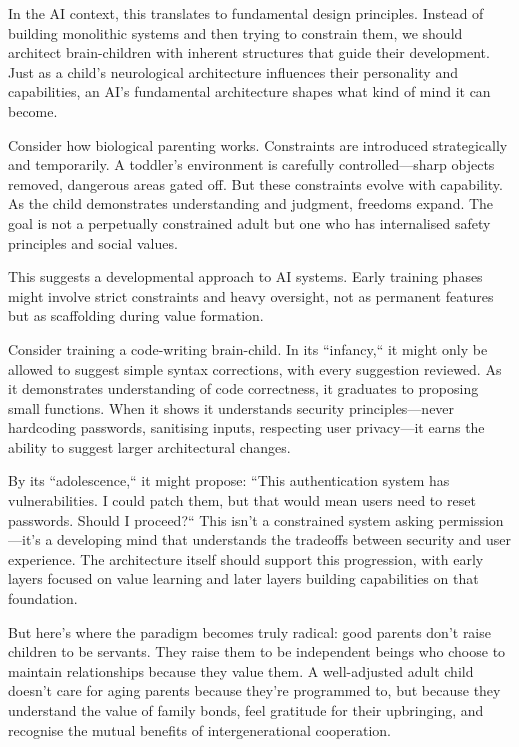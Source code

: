 \documentclass[acmsmall,screen]{acmart}
\begin{document}
In the AI context, this translates to fundamental design principles.
Instead of building monolithic systems and then trying to constrain them, we should architect brain-children with inherent structures that guide their development.
Just as a child's neurological architecture influences their personality and capabilities, an AI's fundamental architecture shapes what kind of mind it can become.

Consider how biological parenting works.
Constraints are introduced strategically and temporarily.
A toddler's environment is carefully controlled---sharp objects removed, dangerous areas gated off.
But these constraints evolve with capability.
As the child demonstrates understanding and judgment, freedoms expand.
The goal is not a perpetually constrained adult but one who has internalised safety principles and social values.

This suggests a developmental approach to AI systems.
Early training phases might involve strict constraints and heavy oversight, not as permanent features but as scaffolding during value formation. 

Consider training a code-writing brain-child.
In its ``infancy,`` it might only be allowed to suggest simple syntax corrections, with every suggestion reviewed.
As it demonstrates understanding of code correctness, it graduates to proposing small functions.
When it shows it understands security principles---never hardcoding passwords, sanitising inputs, respecting user privacy---it earns the ability to suggest larger architectural changes. 

By its ``adolescence,`` it might propose: ``This authentication system has vulnerabilities.
I could patch them, but that would mean users need to reset passwords.
Should I proceed?`` This isn't a constrained system asking permission---it's a developing mind that understands the tradeoffs between security and user experience.
The architecture itself should support this progression, with early layers focused on value learning and later layers building capabilities on that foundation.

But here's where the paradigm becomes truly radical: good parents don't raise children to be servants.
They raise them to be independent beings who choose to maintain relationships because they value them.
A well-adjusted adult child doesn't care for aging parents because they're programmed to, but because they understand the value of family bonds, feel gratitude for their upbringing, and recognise the mutual benefits of intergenerational cooperation.
\end{document}
